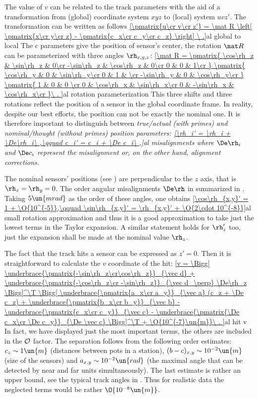 The value of $v$ can be related to the track parameters with the aid of a transformation from (global) coordinate system $xyz$ to (local) system $uvz'$. The transformation can be written as follows
\eqref{\pmatrix{u\cr v\cr z'} = \mat R \left[ \pmatrix{x\cr y\cr z}  - \pmatrix{c_x\cr c_y\cr c_z}  \right] \ .}{al global to local}
The $c$ parameters give the position of sensor's center, the rotation $\mat R$ can be parameterized with three angles $\rh_{x,y,z}$:
\eqref{\mat R =
\pmatrix{
\cos\rh_z  & \sin\rh_z & 0\cr
-\sin\rh_z & \cos\rh_z & 0\cr
0		   & 0         & 1\cr
}
\pmatrix{
\cos\rh_y  & 0 & \sin\rh_y\cr
0		   & 1 &          \cr
-\sin\rh_y & 0 & \cos\rh_y\cr
}
\pmatrix{
1 & 0		   & 0        \cr
0 & \cos\rh_x  & \sin\rh_x\cr
0 & -\sin\rh_x & \cos\rh_x\cr
}\ .
}{al rotation parameterization}
This three shifts and three rotations reflect the position of a sensor in the global coordinate frame. In reality, despite our best efforts, the position can not be exactly the nominal one. It is therefore important to distinguish between \em{true/actual} (with primes) and \em{nominal/thought} (without primes) position parameters:
\eqref{\rh_i' = \rh_i + \De\rh_i\ ,\qquad c_i' = c_i + \De c_i\ ,}{al misalignments}
where $\De\rh_i$ and $\De c_i$ represent the \em{misalignment} or, on the other hand, \em{alignment corrections}.

The nominal sensors' positions (see ) are perpendicular to the $z$ axis, that is $\rh_x=\rh_y=0$. The order angular misalignments $\De\rh$ in summarized in . Taking $5\un{mrad}$ as the order of these angles, one obtains
\eqref{\cos\rh_{x,y}' = 1 + \O{10^{-5}},\qquad \sin\rh_{x,y}' = \rh_{x,y}' + \O{2\cdot 10^{-8}}}{al small rotation approximation}
and thus it is a good approximation to take just the lowest terms in the Taylor expansion. A similar statement holds for $\rh_z'$ too, just the expansion shall be made at the nominal value $\rh_z$.

The fact that the track  hits a sensor can be expressed as $z' = 0$. Then it is straightforward to calculate the $v$ coordinate of the hit:
\eqref{v =
	\Bigg[
		\underbrace{\pmatrix{-\sin\rh_z\cr\cos\rh_z}}_{\vec d}
		+ \underbrace{\pmatrix{-\cos\rh_z\cr -\sin\rh_z}}_{\vec d_\perp} \De\rh_z
	\Bigg]^\T
	\Bigg[
		\underbrace{\pmatrix{a_x\cr a_y}}_{\vec a} (c_z + \De c_z)
		 + \underbrace{\pmatrix{b_x\cr b_y}}_{\vec b}
		 - \underbrace{\pmatrix{c_x\cr c_y}}_{\vec c}
		 - \underbrace{\pmatrix{\De c_x\cr \De c_y}}_{\De \vec c}
	\Bigg]^\T
	+ \O{10^{-7}\un{m}}\ .
}{al hit v}
In fact, we have displayed just the most important terms, the others are included in the $\cal O$ factor. The separation follows from the following order estimates: $c_z \sim 1\un{m}$ (distances between pots in a station), $(b - c)_{x, y} \sim 10^{-2}\un{m}$ (size of the sensors) and $a_{x, y} \sim 10^{-2}\un{rad}$ (the maximal angle that can be detected by near and far units simultaneously). The last estimate is rather an upper bound, see the typical track angles in . Thus for realistic data the neglected terms would be rather $\O{10^{-8}\un{m}}$.

